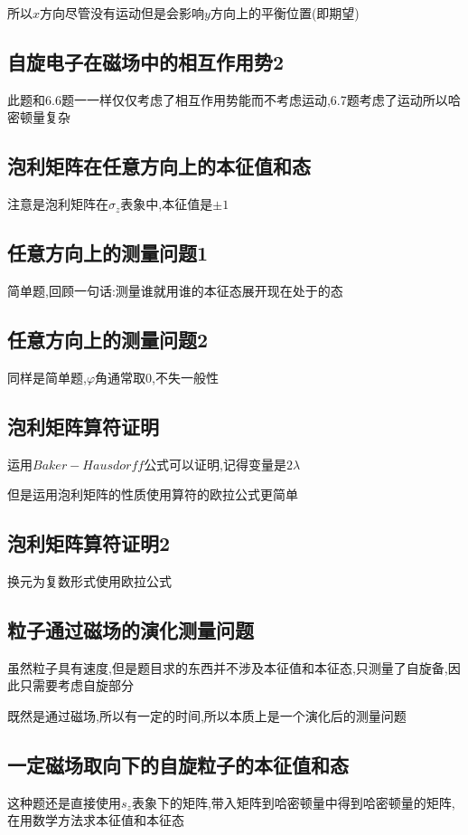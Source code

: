             所以$x$方向尽管没有运动但是会影响$y$方向上的平衡位置(即期望)

        \subsection{自旋电子在磁场中的相互作用势2}

            此题和6.6题一一样仅仅考虑了相互作用势能而不考虑运动,6.7题考虑了运动所以哈密顿量复杂

        \subsection{泡利矩阵在任意方向上的本征值和态}
            注意是泡利矩阵在$\sigma_{z}$表象中,本征值是$\pm1$

        \subsection{任意方向上的测量问题1}
            简单题,回顾一句话:测量谁就用谁的本征态展开现在处于的态

        \subsection{任意方向上的测量问题2}
            同样是简单题,$\varphi$角通常取0,不失一般性

        \subsection{泡利矩阵算符证明}
            运用$Baker-Hausdorff$公式可以证明,记得变量是$2\lambda$

            但是运用泡利矩阵的性质使用算符的欧拉公式更简单

        \subsection{泡利矩阵算符证明2}
            换元为复数形式使用欧拉公式

        \subsection{粒子通过磁场的演化测量问题}
            虽然粒子具有速度,但是题目求的东西并不涉及本征值和本征态,只测量了自旋备,因此只需要考虑自旋部分

            既然是通过磁场,所以有一定的时间,所以本质上是一个演化后的测量问题

        \subsection{一定磁场取向下的自旋粒子的本征值和态}
            这种题还是直接使用$s_{z}$表象下的矩阵,带入矩阵到哈密顿量中得到哈密顿量的矩阵,在用数学方法求本征值和本征态

